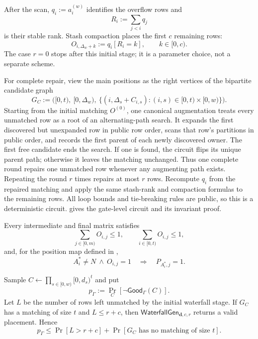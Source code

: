 After the scan, $q_i:=a_i^{(w)}$ identifies the overflow rows and
\begin{equation}\label{eq:waterfall-stash-rank}
 R_i:=\sum_{j<i}q_j
\end{equation}
is their stable rank.  Stash compaction places the first $c$ remaining rows:
\begin{equation}\label{eq:waterfall-stash-owner}
 O_{i,\Delta_w+k}:=q_i[R_i=k],
 \qquad k\in[0,c).
\end{equation}
The case $r=0$ stops after this initial stage; it is a parameter choice, not a
separate scheme.

For complete repair, view the main positions as the right vertices of the
bipartite candidate graph
\begin{equation}\label{eq:waterfall-candidate-graph}
 G_C:=\bigl([0,t),\ [0,\Delta_w),\
 \{(i,\Delta_s+C_{i,s}):(i,s)\in[0,t)\times[0,w)\}\bigr).
\end{equation}
Starting from the initial matching $O^{(0)}$, one canonical augmentation treats
every unmatched row as a root of an alternating-path search.  It expands the
first discovered but unexpanded row in public row order, scans that row's
partitions in public order, and records the first parent of each newly
discovered owner.  The first free candidate ends the search.  If one is found,
the circuit flips its unique parent path; otherwise it leaves the matching
unchanged.  Thus one complete round repairs one unmatched row whenever any
augmenting path exists.  Repeating the round $r$ times repairs at most $r$
rows. Recompute $q_i$ from the repaired matching and apply the same
stash-rank and compaction formulas to the remaining rows.
All loop bounds and tie-breaking rules are public, so this is a
deterministic circuit.   gives the
gate-level circuit and its invariant proof.

Every intermediate and final matrix satisfies
\begin{equation}\label{eq:waterfall-placement-invariants}
 \sum_{j\in[0,m)}O_{i,j}\leq1,
 \qquad
 \sum_{i\in[0,t)}O_{i,j}\leq1,
\end{equation}
and, for the position map defined in ,
\begin{equation}\label{eq:waterfall-placement-subset}
 A_i^*\neq N\ \land\ O_{i,j}=1
 \quad\Longrightarrow\quad P_{A_i^*,j}=1.
\end{equation}

\begin{proposition}
\label{prop:waterfall-reachability-repair}
Sample $C\gets\prod_{s\in[0,w)}[0,d_s)^t$ and put
\[
 p_\Gamma:=\Pr_C[\neg\mathsf{Good}_\Gamma(C)].
\]
Let $L$ be the number of rows left unmatched by the initial waterfall stage.
If $G_C$ has a matching of size $t$ and $L\leq r+c$, then
$\mathsf{WaterfallGen}_{\mathbf d,c,r}$ returns a valid placement.  Hence
\begin{equation}\label{eq:waterfall-reachability-rejection}
 p_\Gamma\leq
 \Pr[L>r+c]+\Pr[G_C\text{ has no matching of size }t].
\end{equation}
\end{proposition}

